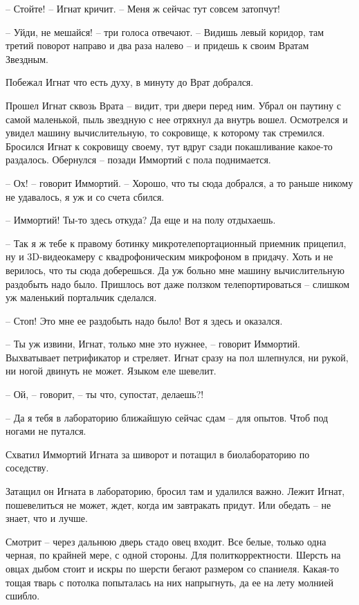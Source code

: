 \documentclass[ebook,oneside,final,openright]{memoir}
\begin{document}
– Стойте! – Игнат кричит. – Меня ж сейчас тут совсем затопчут!\par
– Уйди, не мешайся! – три голоса отвечают. – Видишь левый коридор, там третий поворот направо и два раза налево – и придешь к своим Вратам Звездным.\par
\par
Побежал Игнат что есть духу, в минуту до Врат добрался.\par
\par
Прошел Игнат сквозь Врата – видит, три двери перед ним. Убрал он паутину с самой маленькой, пыль звездную с нее отряхнул да внутрь вошел. Осмотрелся и увидел машину вычислительную, то сокровище, к которому так стремился. Бросился Игнат к сокровищу своему, тут вдруг сзади покашливание какое-то раздалось. Обернулся – позади Иммортий с пола поднимается.\par
– Ох! – говорит Иммортий. – Хорошо, что ты сюда добрался, а то раньше никому не удавалось, я уж и со счета сбился.\par
– Иммортий! Ты-то здесь откуда? Да еще и на полу отдыхаешь.\par
– Так я ж тебе к правому ботинку микротелепортационный приемник прицепил, ну и 3D-видеокамеру с квадрофоническим микрофоном в придачу. Хоть и не верилось, что ты сюда доберешься. Да уж больно мне машину вычислительную раздобыть надо было. Пришлось вот даже ползком телепортироваться – слишком уж маленький портальчик сделался.\par
– Стоп! Это мне ее раздобыть надо было! Вот я здесь и оказался.\par
– Ты уж извини, Игнат, только мне это нужнее, – говорит Иммортий. Выхватывает петрификатор и стреляет. Игнат сразу на пол шлепнулся, ни рукой, ни ногой двинуть не может. Языком еле шевелит.\par
– Ой, – говорит, – ты что, супостат, делаешь?!\par
– Да я тебя в лабораторию ближайшую сейчас сдам – для опытов. Чтоб под ногами не путался.\par
Схватил Иммортий Игната за шиворот и потащил в биолабораторию по соседству.\par
\par
Затащил он Игната в лабораторию, бросил там и удалился важно. Лежит Игнат, пошевелиться не может, ждет, когда им завтракать придут. Или обедать – не знает, что и лучше. \par
Смотрит – через дальнюю дверь стадо овец входит. Все белые, только одна черная, по крайней мере, с одной стороны. Для политкорректности. Шерсть на овцах дыбом стоит и искры по шерсти бегают размером со спаниеля. Какая-то тощая тварь с потолка попыталась на них напрыгнуть, да ее на лету молнией сшибло.\par
\end{document}
